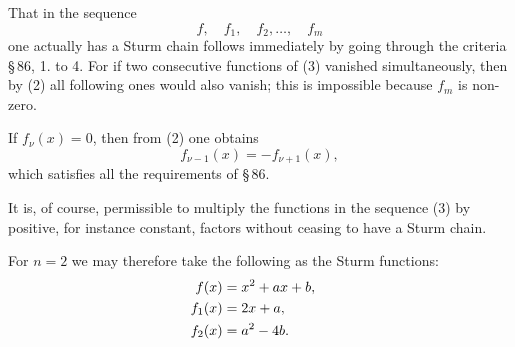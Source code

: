 \documentclass[11pt]{article}
\begin{document}
That in the sequence
\begin{equation}
        f,
        \quad f_1,
        \quad f_2,
        \ldots,
        \quad f_m
\tag{3}
\end{equation}
one actually has a Sturm chain follows immediately by going through the criteria \S\,86, 1. to 4. For if two consecutive functions of (3) vanished simultaneously, then by (2) all following ones would also vanish; this is impossible because $f_m$ is non-zero.

If $f_\nu(x)=0$, then from (2) one obtains
\[
        f_{\nu-1}(x)=-f_{\nu+1}(x),
\]
which satisfies all the requirements of \S\,86.

It is, of course, permissible to multiply the functions in the sequence (3) by positive, for instance constant, factors without ceasing to have a Sturm chain.

For $n=2$ we may therefore take the following as the Sturm functions:
\[
\begin{aligned}
        f(x)&=x^2+ax+b,\cr
        f_1(x)&=2x+a,\cr
        f_2(x)&=a^2-4b.
\end{aligned}
\]
\end{document}
